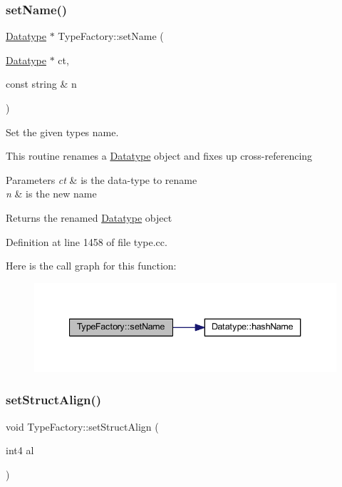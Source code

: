 \subsubsection{\texorpdfstring{setName()}{setName()}}
{\footnotesize\ttfamily \mbox{\hyperlink{class_datatype}{Datatype}} $\ast$ Type\+Factory\+::set\+Name (\begin{DoxyParamCaption}\item[{\mbox{\hyperlink{class_datatype}{Datatype}} $\ast$}]{ct,  }\item[{const string \&}]{n }\end{DoxyParamCaption})}



Set the given types name. 

This routine renames a \mbox{\hyperlink{class_datatype}{Datatype}} object and fixes up cross-\/referencing 
\begin{DoxyParams}{Parameters}
{\em ct} & is the data-\/type to rename \\
\hline
{\em n} & is the new name \\
\hline
\end{DoxyParams}
\begin{DoxyReturn}{Returns}
the renamed \mbox{\hyperlink{class_datatype}{Datatype}} object 
\end{DoxyReturn}


Definition at line 1458 of file type.\+cc.

Here is the call graph for this function\+:
\nopagebreak
\begin{figure}[H]
\begin{center}
\leavevmode
\includegraphics[width=340pt]{class_type_factory_a6a2c74462f5a832e6233421bb6cb1beb_cgraph}
\end{center}
\end{figure}
\mbox{\label{class_type_factory_aa0ffda99be9ec6acf0bc8a963021e050}} 
\subsubsection{\texorpdfstring{setStructAlign()}{setStructAlign()}}
{\footnotesize\ttfamily void Type\+Factory\+::set\+Struct\+Align (\begin{DoxyParamCaption}\item[{int4}]{al }\end{DoxyParamCaption})\hspace{0.3cm}{\ttfamily [inline]}}




